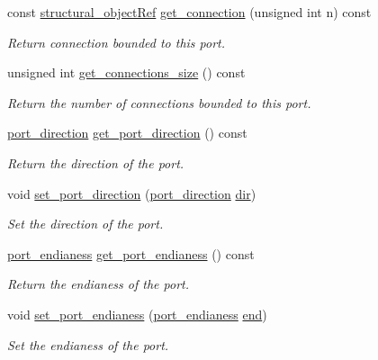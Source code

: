 \begin{DoxyCompactItemize}
\item 
const \hyperlink{structural__objects_8hpp_a8ea5f8cc50ab8f4c31e2751074ff60b2}{structural\+\_\+object\+Ref} \hyperlink{structport__o_a55e9ec7a31da21298c60c177634f8407}{get\+\_\+connection} (unsigned int n) const
\begin{DoxyCompactList}\small\item\em Return connection bounded to this port. \end{DoxyCompactList}\item 
unsigned int \hyperlink{structport__o_a97fbec658342d6a3a918f5956e50c718}{get\+\_\+connections\+\_\+size} () const
\begin{DoxyCompactList}\small\item\em Return the number of connections bounded to this port. \end{DoxyCompactList}\item 
\hyperlink{structport__o_adb254df5665ff28b0769491cc3899fd5}{port\+\_\+direction} \hyperlink{structport__o_a753a6075fd5a4728732e0719d34c914c}{get\+\_\+port\+\_\+direction} () const
\begin{DoxyCompactList}\small\item\em Return the direction of the port. \end{DoxyCompactList}\item 
void \hyperlink{structport__o_ad0168cc3891abada26f9ff2cd213563d}{set\+\_\+port\+\_\+direction} (\hyperlink{structport__o_adb254df5665ff28b0769491cc3899fd5}{port\+\_\+direction} \hyperlink{structport__o_a27f4a8d47d3f3b064d72443da1ee450c}{dir})
\begin{DoxyCompactList}\small\item\em Set the direction of the port. \end{DoxyCompactList}\item 
\hyperlink{structport__o_a7f16c53245215df0064e1b8ef27a36e3}{port\+\_\+endianess} \hyperlink{structport__o_a7adbc2daad0ee797ff897b0c3453516d}{get\+\_\+port\+\_\+endianess} () const
\begin{DoxyCompactList}\small\item\em Return the endianess of the port. \end{DoxyCompactList}\item 
void \hyperlink{structport__o_a1aa10dc8e4f34e44ecd95711d0ed6e56}{set\+\_\+port\+\_\+endianess} (\hyperlink{structport__o_a7f16c53245215df0064e1b8ef27a36e3}{port\+\_\+endianess} \hyperlink{structport__o_a1d392170891caecd4e6a4888b25cec38}{end})
\begin{DoxyCompactList}\small\item\em Set the endianess of the port. \end{DoxyCompactList}\item 

\end{DoxyCompactItemize}
